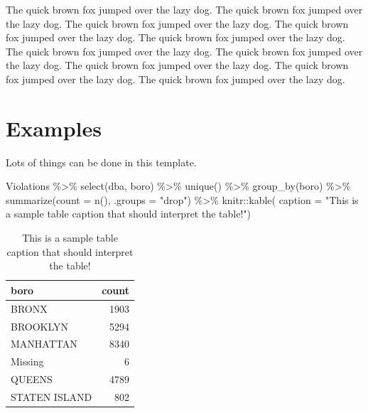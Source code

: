 \documentclass[12pt]{article}
\newenvironment{Shaded}{\begin{snugshade}}{\end{snugshade}}
\newcommand{\AttributeTok}[1]{\textcolor[rgb]{0.77,0.63,0.00}{#1}}
\newcommand{\FunctionTok}[1]{\textcolor[rgb]{0.00,0.00,0.00}{#1}}
\newcommand{\NormalTok}[1]{#1}
\newcommand{\SpecialCharTok}[1]{\textcolor[rgb]{0.00,0.00,0.00}{#1}}
\newcommand{\StringTok}[1]{\textcolor[rgb]{0.31,0.60,0.02}{#1}}
\begin{document}
The quick brown fox jumped over the lazy dog. The quick brown fox jumped
over the lazy dog. The quick brown fox jumped over the lazy dog. The
quick brown fox jumped over the lazy dog. The quick brown fox jumped
over the lazy dog. The quick brown fox jumped over the lazy dog. The
quick brown fox jumped over the lazy dog. The quick brown fox jumped
over the lazy dog. The quick brown fox jumped over the lazy dog. The
quick brown fox jumped over the lazy dog.

\hypertarget{examples}{%
\section{Examples}\label{examples}}

Lots of things can be done in this template.

\begin{Shaded}
\begin{Highlighting}[]
\NormalTok{Violations }\SpecialCharTok{\%\textgreater{}\%}
  \FunctionTok{select}\NormalTok{(dba, boro) }\SpecialCharTok{\%\textgreater{}\%}
  \FunctionTok{unique}\NormalTok{() }\SpecialCharTok{\%\textgreater{}\%}
  \FunctionTok{group\_by}\NormalTok{(boro) }\SpecialCharTok{\%\textgreater{}\%}
  \FunctionTok{summarize}\NormalTok{(}\AttributeTok{count =} \FunctionTok{n}\NormalTok{(), }\AttributeTok{.groups =} \StringTok{"drop"}\NormalTok{) }\SpecialCharTok{\%\textgreater{}\%}
\NormalTok{  knitr}\SpecialCharTok{::}\FunctionTok{kable}\NormalTok{(}
    \AttributeTok{caption =} \StringTok{"This is a sample table caption that should interpret the table!"}\NormalTok{)}
\end{Highlighting}
\end{Shaded}

\begin{table}

\caption{\label{tab:sample-table1}This is a sample table caption that should interpret the table!}
\centering
\begin{tabular}[t]{l|r}
\hline
boro & count\\
\hline
BRONX & 1903\\
\hline
BROOKLYN & 5294\\
\hline
MANHATTAN & 8340\\
\hline
Missing & 6\\
\hline
QUEENS & 4789\\
\hline
STATEN ISLAND & 802\\
\hline
\end{tabular}
\end{table}
\end{document}
